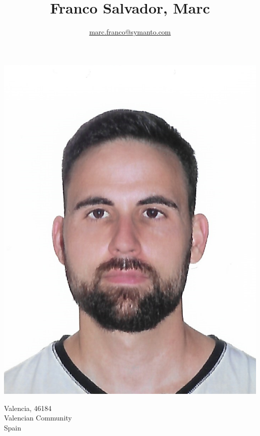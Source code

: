 \documentclass[10pt]{article}
\title{\bfseries\Huge Franco Salvador, Marc}
\author{\href{mailto:marc.franco@symanto.com}{marc.franco@symanto.com}}
\date{}
\begin{document}
\begin{minipage}{0.65\textwidth}
\begingroup
\let\center\flushleft
\let\endcenter\endflushleft
\maketitle
\endgroup
\end{minipage}
\begin{minipage}{0.3\textwidth}
\includegraphics[scale=0.17]{img/marc}
\end{minipage}

\begin{minipage}[ht]{0.48\textwidth}
Valencia, 46184\\
Valencian Community\\
Spain
\end{minipage}
\begin{minipage}[ht]{0.48\textwidth}

\end{minipage}
\end{document}
